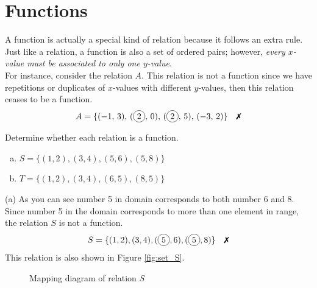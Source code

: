 \section{Functions}
A function is actually a special kind of relation because it follows an extra rule. Just like a relation, a function is also a set of ordered pairs; however, \textsl{every $x$-value must be associated to only one $y$-value}.\\
For instance, consider the relation $A$. This relation is not a function since we have repetitions or duplicates of $x$-values with different $y$-values, then this relation ceases to be a function.
\begin{equation*}
    A =\{(-1,\,3),\,(\circled{2},\,0),\,(\circled{2},\,5),\,(-3,\,2)\} \quad \text{\xmark}
\end{equation*}
\begin{exa}
Determine whether each relation is a function.
    \begin{enumerate}[(a)]
       \item $S=\{(1,2),(3,4),(5,6),(5,8)\}$
        \item $T=\{(1,2),(3,4),(6,5),(8,5)\}$
    \end{enumerate}
\end{exa}
(a) As you can see number 5 in domain corresponds to both number 6 and 8. Since number 5 in the domain corresponds to more than one element in range, the relation $S$ is not a function.
\begin{equation*}
    S = \{(1,2),(3,4),(\circled{5},6),(\circled{5},8)\} \quad \text{\xmark}
\end{equation*}
This relation is also shown in Figure \eqref{fig:set_S}.\\
\begin{figure}[ht]
\centering
{}
\caption{Mapping diagram of relation $S$}
\label{fig:set_S}
\end{figure}

